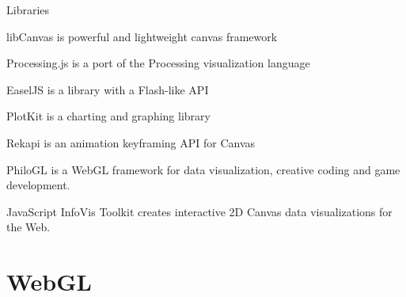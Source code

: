 \documentclass{beamer}
\begin{document}
\begin{frame}{Libraries}

libCanvas is powerful and lightweight canvas framework

Processing.js is a port of the Processing visualization language

EaselJS is a library with a Flash-like API

PlotKit is a charting and graphing library

Rekapi is an animation keyframing API for Canvas

PhiloGL is a WebGL framework for data visualization, creative coding and game development.

JavaScript InfoVis Toolkit creates interactive 2D Canvas data visualizations for the Web.


\end{frame}



\section{WebGL}
\end{document}
